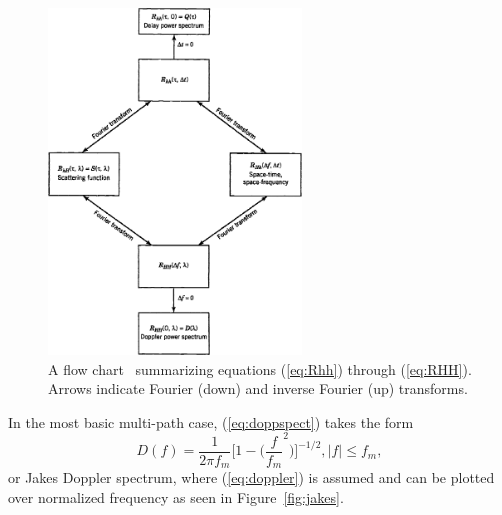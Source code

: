 \begin{figure}[ht!]
	\centering	\includegraphics[width=0.6\textwidth,keepaspectratio]{figs/doppler_flow.png}
    \caption{A flow chart~\cite{pahlavan2005wireless} summarizing equations (\ref{eq:Rhh}) through (\ref{eq:RHH}). Arrows indicate Fourier (down) and inverse Fourier (up) transforms.} 
\label{fig:doppflow}      
\end{figure}
In the most basic multi-path case, (\ref{eq:doppspect}) takes the form
\begin{equation}
\label{eq:jakes}
D(f) = \frac{1}{2\pi f_m} \bigg[1-\bigg(\frac{f}{f_m}^2 \bigg)  \bigg]^{-1/2}, |f| \leq f_m,
\end{equation}
or Jakes Doppler spectrum, where (\ref{eq:doppler}) is assumed and can be plotted over normalized frequency as seen in Figure~\ref{fig:jakes}.

